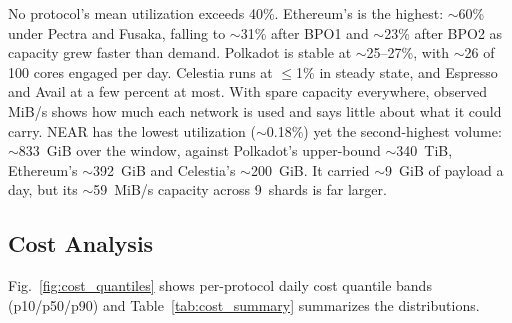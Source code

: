 No protocol's mean utilization exceeds 40\%.
Ethereum's is the highest: $\sim$60\% under Pectra and Fusaka, falling to $\sim$31\% after BPO1 and $\sim$23\% after BPO2 as capacity grew faster than demand.
Polkadot is stable at $\sim$25--27\%, with $\sim$26 of 100 cores engaged per day.
Celestia runs at $\le$1\% in steady state, and Espresso and Avail at a few percent at most.
With spare capacity everywhere, observed MiB/s shows how much each network is used and says little about what it could carry.
NEAR has the lowest utilization ($\sim$0.18\%) yet the second-highest volume: $\sim$833~GiB over the window, against Polkadot's upper-bound $\sim$340~TiB, Ethereum's $\sim$392~GiB and Celestia's $\sim$200~GiB.
It carried $\sim$9~GiB of payload a day, but its $\sim$59~MiB/s capacity across 9~shards is far larger.

\subsection{Cost Analysis}
\label{sec:results-cost}

Fig.~\ref{fig:cost_quantiles} shows per-protocol daily cost quantile bands (p10/p50/p90) and Table~\ref{tab:cost_summary} summarizes the distributions.

